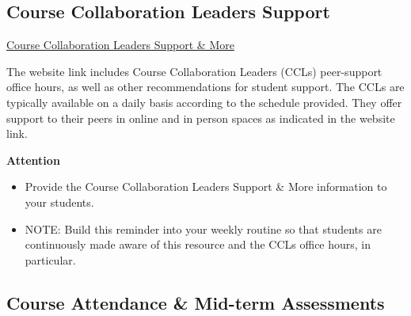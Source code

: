 \documentclass[
  letterpaper,
  DIV=11,
  numbers=noendperiod]{scrreprt}
\providecommand{\tightlist}{%
  \setlength{\itemsep}{0pt}\setlength{\parskip}{0pt}}
\begin{document}
\subsection{Course Collaboration Leaders
Support}\label{course-collaboration-leaders-support}

\href{https://datascienceacademy.ncsu.edu/courses/course-collaboration-leaders/}{Course
Collaboration Leaders Support \& More}

The website link includes Course Collaboration Leaders (CCLs)
peer-support office hours, as well as other recommendations for student
support. The CCLs are typically available on a daily basis according to
the schedule provided. They offer support to their peers in online and
in person spaces as indicated in the website link.

\begin{tcolorbox}[enhanced jigsaw, toprule=.15mm, colback=white, arc=.35mm, colframe=quarto-callout-note-color-frame, bottomrule=.15mm, rightrule=.15mm, breakable, leftrule=.75mm, left=2mm, opacityback=0]
\begin{minipage}[t]{5.5mm}
\textcolor{quarto-callout-note-color}{\faInfo}
\end{minipage}%
\begin{minipage}[t]{\textwidth - 5.5mm}

\vspace{-3mm}\textbf{{Attention}}\vspace{3mm}

\begin{itemize}
\tightlist
\item
  {Provide the Course Collaboration Leaders Support \& More information
  to your students.}
\end{itemize}

\end{minipage}%
\end{tcolorbox}

\begin{itemize}
\tightlist
\item
  NOTE: Build this reminder into your weekly routine so that students
  are continuously made aware of this resource and the CCLs office
  hours, in particular.
\end{itemize}

\subsection{Course Attendance \& Mid-term
Assessments}\label{course-attendance-mid-term-assessments}
\end{document}
